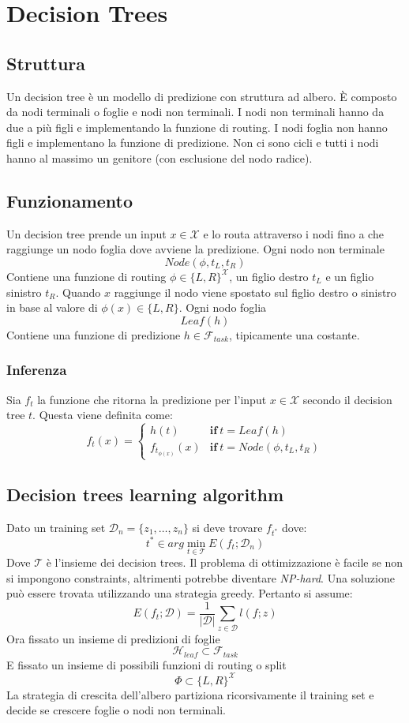 \chapter{Decision Trees}

\section{Struttura}
Un decision tree \`e un modello di predizione con struttura ad albero.
\`E composto da nodi terminali o foglie e nodi non terminali.
I nodi non terminali hanno da due a pi\`u figli e implementando la funzione di routing.
I nodi foglia non hanno figli e implementano la funzione di predizione.
Non ci sono cicli e tutti i nodi hanno al massimo un genitore (con esclusione del nodo radice).

\section{Funzionamento}
Un decision tree prende un input $x\in\mathcal{X}$ e lo routa attraverso i nodi fino a che raggiunge un nodo foglia dove avviene la predizione.
Ogni nodo non terminale
$$Node(\phi, t_L, t_R)$$
Contiene una funzione di routing $\phi\in\{L, R\}^{\mathcal{X}}$, un figlio destro $t_L$ e un figlio sinistro $t_R$.
Quando $x$ raggiunge il nodo viene spostato sul figlio destro o sinistro in base al valore di $\phi(x)\in\{L,R\}$.
Ogni nodo foglia
$$Leaf(h)$$
Contiene una funzione di predizione $h\in\mathcal{F}_{task}$, tipicamente una costante.

	\subsection{Inferenza}
	Sia $f_t$ la funzione che ritorna la predizione per l'input $x\in\mathcal{X}$ secondo il decision tree $t$.
	Questa viene definita come:
	$$f_t(x)=\begin{cases}h(t)&\mathbf{if}\ t = Leaf(h)\\
										 f_{t_{\phi(x)}}(x)&\mathbf{if}\ t = Node(\phi, t_L, t_R)
				\end{cases}$$

\section{Decision trees learning algorithm}
Dato un training set $\mathcal{D}_n = \{z_1,\dots, z_n\}$ si deve trovare $f_{t^*}$ dove:
$$t^*\in arg\min\limits_{t\in\mathcal{T}} E(f_t;\mathcal{D}_n)$$
Dove $\mathcal{T}$ \`e l'insieme dei decision trees.
Il problema di ottimizzazione \`e facile se non si impongono constraints, altrimenti potrebbe diventare \emph{NP-hard}.
Una soluzione pu\`o essere trovata utilizzando una strategia greedy.
Pertanto si assume:
$$E(f_t;\mathcal{D}) = \dfrac{1}{|\mathcal{D}|}\sum\limits_{z\in\mathcal{D}}l(f;z)$$
Ora fissato un insieme di predizioni di foglie
$$\mathcal{H}_{leaf}\subset\mathcal{F}_{task}$$
E fissato un insieme di possibili funzioni di routing o split
$$\Phi\subset\{L,R\}^\mathcal{X}$$
La strategia di crescita dell'albero partiziona ricorsivamente il training set e decide se crescere foglie o nodi non terminali.

